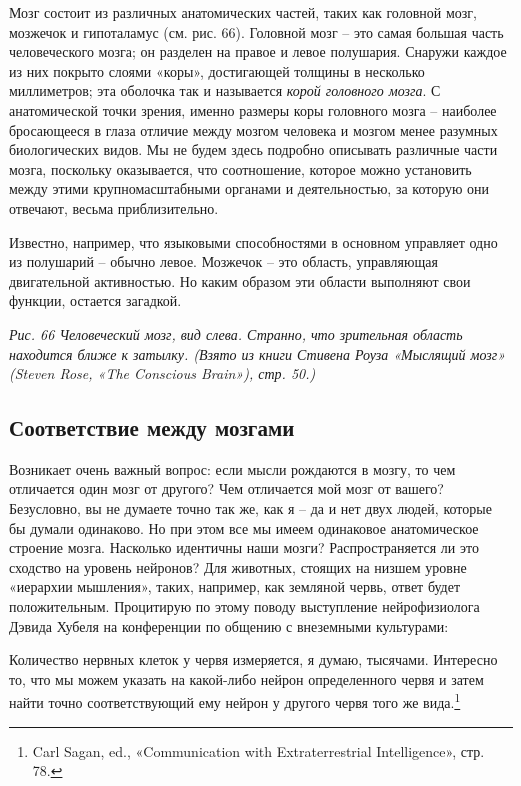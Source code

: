 \documentclass[../main.tex]{subfiles}
\begin{document}
Мозг состоит из различных анатомических частей, таких как головной мозг, мозжечок и гипоталамус (см. рис. 66). Головной мозг \--- это самая большая часть человеческого мозга; он разделен на правое и левое полушария. Снаружи каждое из них покрыто слоями «коры», достигающей толщины в несколько миллиметров; эта оболочка так и называется \emph{корой головного мозга}. С анатомической точки зрения, именно размеры коры головного мозга \--- наиболее бросающееся в глаза отличие между мозгом человека и мозгом менее разумных биологических видов. Мы не будем здесь подробно описывать различные части мозга, поскольку оказывается, что соотношение, которое можно установить между этими крупномасштабными органами и деятельностью, за которую они отвечают, весьма приблизительно.

Известно, например, что языковыми способностями в основном управляет одно из полушарий \--- обычно левое. Мозжечок \--- это область, управляющая двигательной активностью. Но каким образом эти области выполняют свои функции, остается загадкой.

\emph{Рис. 66 Человеческий мозг, вид слева. Странно, что зрительная область находится ближе к затылку. (Взято из книги Стивена Роуза «Мыслящий мозг» (Steven Rose, «The Conscious Brain»), стр. 50.)}


\subsection{Соответствие между мозгами}

Возникает очень важный вопрос: если мысли рождаются в мозгу, то чем отличается один мозг от другого? Чем отличается мой мозг от вашего? Безусловно, вы не думаете точно так же, как я \--- да и нет двух людей, которые бы думали одинаково. Но при этом все мы имеем одинаковое анатомическое строение мозга. Насколько идентичны наши мозги? Распространяется ли это сходство на уровень нейронов? Для животных, стоящих на низшем уровне «иерархии мышления», таких, например, как земляной червь, ответ будет положительным. Процитирую по этому поводу выступление нейрофизиолога Дэвида Хубеля на конференции по общению с внеземными культурами:

Количество нервных клеток у червя измеряется, я думаю, тысячами. Интересно то, что мы можем указать на какой-либо нейрон определенного червя и затем найти точно соответствующий ему нейрон у другого червя того же вида.\footnote{Carl Sagan, ed., «Communication with Extraterrestrial Intelligence», стр. 78.}
\end{document}
